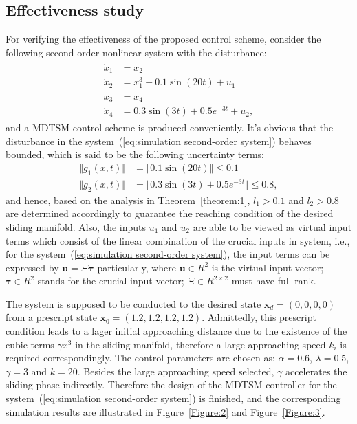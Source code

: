 \documentclass[3p]{elsarticle}
\theoremstyle{plain}
\theoremstyle{remark}
\begin{document}
\subsection{Effectiveness study}
For verifying the effectiveness of the proposed control scheme, consider the following second-order nonlinear system with the disturbance:
\begin{align}
\begin{split}
\dot x_1 &= x_2\\
\dot x_2 &= x_1^3+0.1\sin(20t)+u_1\\
\dot x_3 &= x_4\\
\dot x_4 &= 0.3\sin(3t)+0.5e^{-3t}+u_2,\label{eq:simulation second-order system}
\end{split}
\end{align}
and a MDTSM control scheme is produced conveniently. It's obvious that the disturbance in the system~(\ref{eq:simulation second-order system}) behaves bounded, which is said to be the following uncertainty terms:
\begin{align*}
\Vert g_1(x,t)\Vert &= \Vert 0.1\sin(20t)\Vert\le 0.1\\
\Vert g_2(x,t)\Vert &= \Vert 0.3\sin(3t)+0.5e^{-3t}\Vert\le 0.8,
\end{align*}
and hence, based on the analysis in Theorem~\ref{theorem:1}, $l_1>0.1$ and $l_2>0.8$ are determined accordingly to guarantee the reaching condition of the desired sliding manifold. Also, the inputs $u_1$ and $u_2$ are able to be viewed as virtual input terms which consist of the linear combination of the crucial inputs in system, i.e., for the system~(\ref{eq:simulation second-order system}), the input terms can be expressed by $\bm u = \Xi\bm\tau$ particularly, where $\bm u\in R^2$ is the virtual input vector; $\bm \tau\in R^2$ stands for the crucial input vector; $\Xi\in R^{2\times 2}$ must have full rank.\par
The system is supposed to be conducted to the desired state $\bm x_d=(0,0,0,0)$ from a prescript state $\bm x_0=(1.2,1.2,1.2,1.2)$. Admittedly, this prescript condition leads to a lager initial approaching distance due to the existence of the cubic terms $\gamma x^3$ in the sliding manifold, therefore a large approaching speed $k_i$ is required correspondingly. The control parameters are chosen as: $\alpha = 0.6$, $\lambda = 0.5$, $\gamma = 3$ and $k = 20$. Besides the large approaching speed selected, $\gamma$ accelerates the sliding phase indirectly. Therefore the design of the MDTSM controller for the system~(\ref{eq:simulation second-order system}) is finished, and the corresponding simulation results are illustrated in Figure~\ref{Figure:2} and Figure~\ref{Figure:3}.\par
\end{document}
